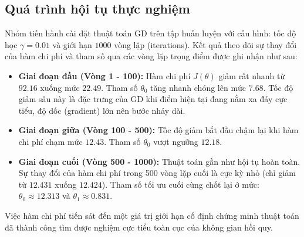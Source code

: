 \subsection{Quá trình hội tụ thực nghiệm}
Nhóm tiến hành cài đặt thuật toán GD trên tập huấn luyện với cấu hình: tốc độ học $\gamma = 0.01$ và giới hạn $1000$ vòng lặp (iterations). Kết quả theo dõi sự thay đổi của hàm chi phí và tham số qua các vòng lặp trọng điểm được ghi nhận như sau:

\begin{itemize}
    \item \textbf{Giai đoạn đầu (Vòng 1 - 100):} Hàm chi phí $J(\theta)$ giảm rất nhanh từ $92.16$ xuống mức $22.49$. Tham số $\theta_0$ tăng nhanh chóng lên mức $7.68$. Tốc độ giảm sâu này là đặc trưng của GD khi điểm hiện tại đang nằm xa đáy cực tiểu, độ dốc (gradient) lớn nên bước nhảy dài.
    \item \textbf{Giai đoạn giữa (Vòng 100 - 500):} Tốc độ giảm bắt đầu chậm lại khi hàm chi phí chạm mức $12.43$. Tham số $\theta_0$ vượt ngưỡng $12.18$.
    \item \textbf{Giai đoạn cuối (Vòng 500 - 1000):} Thuật toán gần như hội tụ hoàn toàn. Sự thay đổi của hàm chi phí trong 500 vòng lặp cuối là cực kỳ nhỏ (chỉ giảm từ $12.431$ xuống $12.424$). Tham số tối ưu cuối cùng chốt lại ở mức: $\theta_0 \approx 12.313$ và $\theta_1 \approx 0.831$.
\end{itemize}

Việc hàm chi phí tiến sát đến một giá trị giới hạn cố định chứng minh thuật toán đã thành công tìm được nghiệm cực tiểu toàn cục của không gian hồi quy.
